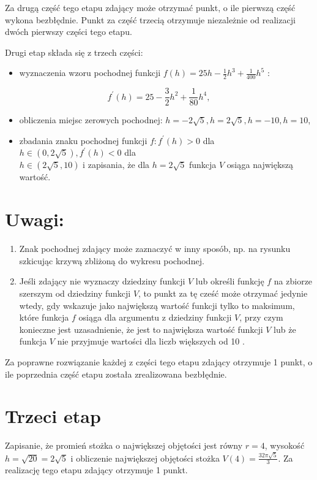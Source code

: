 \documentclass[10pt]{article}
\begin{document}
Za drugą część tego etapu zdający może otrzymać punkt, o ile pierwszą część wykona bezbłędnie. Punkt za część trzecią otrzymuje niezależnie od realizacji dwóch pierwszy części tego etapu.

Drugi etap składa się z trzech części:

\begin{itemize}
  \item wyznaczenia wzoru pochodnej funkcji $f(h)=25 h-\frac{1}{2} h^{3}+\frac{1}{400} h^{5}$ :
\end{itemize}

$$
f^{\prime}(h)=25-\frac{3}{2} h^{2}+\frac{1}{80} h^{4},
$$

\begin{itemize}
  \item obliczenia miejsc zerowych pochodnej: $h=-2 \sqrt{5}, h=2 \sqrt{5}, h=-10, h=10$,
  \item zbadania znaku pochodnej funkcji $f: f^{\prime}(h)>0$ dla $h \in(0,2 \sqrt{5}), f^{\prime}(h)<0$ dla\\
$h \in(2 \sqrt{5}, 10)$ i zapisania, że dla $h=2 \sqrt{5}$ funkcja $V$ osiąga największą wartość.
\end{itemize}

\section*{Uwagi:}
\begin{enumerate}
  \item Znak pochodnej zdający może zaznaczyć w inny sposób, np. na rysunku szkicując krzywą zbliżoną do wykresu pochodnej.
  \item Jeśli zdający nie wyznaczy dziedziny funkcji $V$ lub określi funkcję $f$ na zbiorze szerszym od dziedziny funkcji $V$, to punkt za tę cześć może otrzymać jedynie wtedy, gdy wskazuje jako największą wartość funkcji tylko to maksimum, które funkcja $f$ osiąga dla argumentu z dziedziny funkcji $V$, przy czym konieczne jest uzasadnienie, że jest to największa wartość funkcji $V$ lub że funkcja $V$ nie przyjmuje wartości dla liczb większych od 10 .
\end{enumerate}

Za poprawne rozwiązanie każdej z części tego etapu zdający otrzymuje 1 punkt, o ile poprzednia część etapu została zrealizowana bezbłędnie.

\section*{Trzeci etap}
Zapisanie, że promień stożka o największej objętości jest równy $r=4$, wysokość\\
$h=\sqrt{20}=2 \sqrt{5}$ i obliczenie największej objętości stożka $V(4)=\frac{32 \pi \sqrt{5}}{3}$. Za realizację tego etapu zdający otrzymuje 1 punkt.
\end{document}
